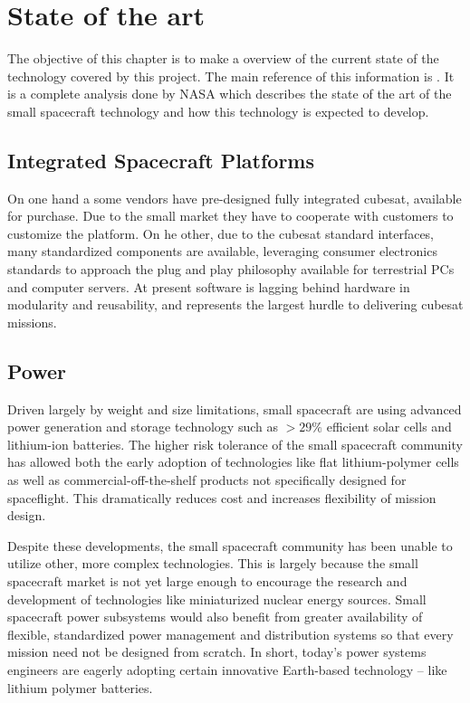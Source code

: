 \chapter{State of the art}
The objective of this chapter is to make a overview of the current state of the technology covered by this project. The main reference of this information is \cite{SOTA}. It is a complete analysis done by NASA which describes the state of the art of the small spacecraft technology and how this technology is expected to develop. 

\section{Integrated Spacecraft Platforms}
On one hand a some vendors have pre-designed fully integrated cubesat, available for purchase. Due to the small market they have to cooperate with customers to customize the platform. On he other,  due to the cubesat standard interfaces, many standardized components are available, leveraging consumer electronics standards to approach the plug and play philosophy available for terrestrial PCs and computer servers. At present software is lagging behind hardware in modularity and reusability, and represents the largest hurdle to delivering cubesat missions. 

\section{Power}
Driven largely by weight and size limitations, small spacecraft are using advanced power generation and storage technology such as $>29\% $ efficient solar cells and lithium-ion batteries. The higher risk tolerance of the small spacecraft community has allowed both the early adoption of technologies like flat lithium-polymer cells as well as commercial-off-the-shelf products not specifically designed for spaceflight. This dramatically reduces cost and increases flexibility of mission design. 

Despite these developments, the small spacecraft community has been unable to utilize other, more complex technologies. This is largely because the small spacecraft market is not yet large enough to encourage the research and development of technologies like miniaturized nuclear energy sources. Small spacecraft power subsystems would also benefit from greater availability of flexible, standardized power management and distribution systems so that every mission need not be designed from scratch. In short, today’s power systems engineers are eagerly adopting certain innovative Earth-based technology – like lithium polymer batteries.

